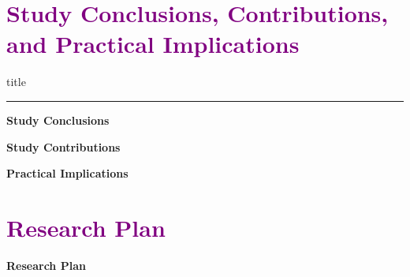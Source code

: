 \documentclass[aspectratio=169]{beamer}
\begin{document}
\section{\textbf{\textcolor{purple}{Study Conclusions, Contributions, and Practical Implications
}}}
    \begin{frame}[plain]
        \vfill
      \centering
      \begin{beamercolorbox}[sep=8pt,center,shadow=true,rounded=true]{title}
        \insertsectionhead\par%
        \color{oxfordblue}\noindent\rule{10cm}{1pt}
      \end{beamercolorbox}
      \vfill
  \end{frame}


\begin{frame}{\textcolor{cmindsblue}{\textbf{Study Conclusions}}}
    
\end{frame}


\begin{frame}{\textcolor{cmindsblue}{\textbf{Study Contributions}}}
    
\end{frame}


\begin{frame}{\textcolor{cmindsblue}{\textbf{Practical Implications}}}
    
\end{frame}

\section{\textbf{\textcolor{purple}{Research Plan}}}

\begin{frame}{\textcolor{cmindsblue}{\textbf{Research Plan}}}
    \vspace{-0.8cm}

\end{frame}
\end{document}
